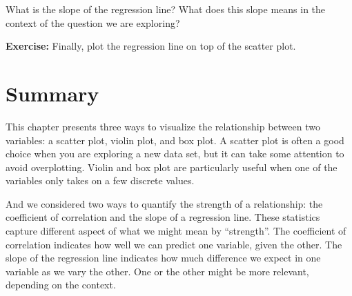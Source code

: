 What is the slope of the regression line? What does this slope means in
the context of the question we are exploring?

\textbf{Exercise:} Finally, plot the regression line on top of the
scatter plot.

\hypertarget{summary}{%
\section{Summary}\label{summary}}

This chapter presents three ways to visualize the relationship between
two variables: a scatter plot, violin plot, and box plot. A scatter plot
is often a good choice when you are exploring a new data set, but it can
take some attention to avoid overplotting. Violin and box plot are
particularly useful when one of the variables only takes on a few
discrete values.

And we considered two ways to quantify the strength of a relationship:
the coefficient of correlation and the slope of a regression line. These
statistics capture different aspect of what we might mean by
``strength''. The coefficient of correlation indicates how well we can
predict one variable, given the other. The slope of the regression line
indicates how much difference we expect in one variable as we vary the
other. One or the other might be more relevant, depending on the
context.

